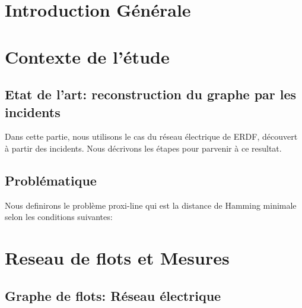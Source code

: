%
%
% 
% 


 

\maketitle
\tableofcontents

\chapter{Introduction G\'en\'erale}
\chapter{Contexte de l'\'etude}
	\section{Etat de l'art: reconstruction du graphe par les incidents}
	Dans cette partie, nous utilisons le cas du r\'eseau \'electrique de ERDF, d\'ecouvert \`a partir des incidents. Nous d\'ecrivons les \'etapes pour parvenir \`a ce resultat. 
	
	\section{Probl\'ematique}
	Nous definirons le probl\`eme proxi-line qui est la distance de Hamming minimale selon les conditions suivantes:
	
\chapter{Reseau de flots et Mesures }
	
	\section{Graphe de flots: R\'eseau \'electrique}
